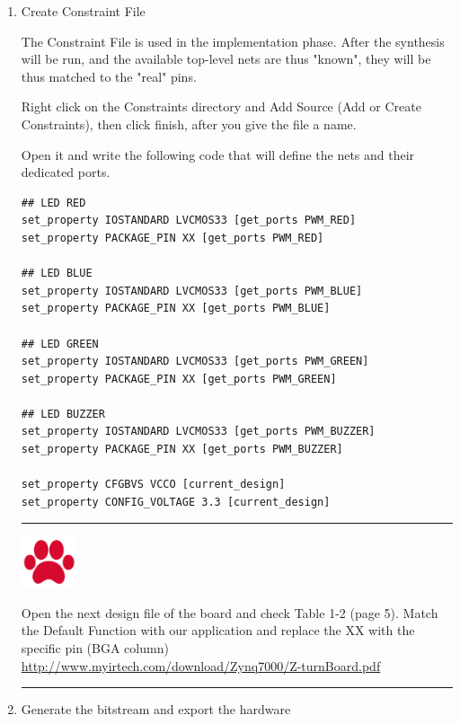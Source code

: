 \documentclass{article}
\begin{document}
\begin{enumerate}
 \item Create Constraint File
 
The Constraint File is used in the implementation phase. After the synthesis will be run, and the available top-level nets are thus "known", they will be thus matched to the "real" pins.
  
Right click on the Constraints directory and Add Source (Add or Create Constraints), then click finish, after you give the file a name.

Open it and write the following code that will define the nets and their dedicated ports.

\begin{verbatim}
## LED RED
set_property IOSTANDARD LVCMOS33 [get_ports PWM_RED]
set_property PACKAGE_PIN XX [get_ports PWM_RED]

## LED BLUE
set_property IOSTANDARD LVCMOS33 [get_ports PWM_BLUE]
set_property PACKAGE_PIN XX [get_ports PWM_BLUE]

## LED GREEN
set_property IOSTANDARD LVCMOS33 [get_ports PWM_GREEN]
set_property PACKAGE_PIN XX [get_ports PWM_GREEN]

## LED BUZZER
set_property IOSTANDARD LVCMOS33 [get_ports PWM_BUZZER]
set_property PACKAGE_PIN XX [get_ports PWM_BUZZER]

set_property CFGBVS VCCO [current_design]
set_property CONFIG_VOLTAGE 3.3 [current_design]

\end{verbatim}

\noindent\rule{16.5cm}{1pt}

\noindent\begin{minipage}{.1\textwidth}
  \centering
  \includegraphics[height=1.5cm]{img/icon.png}
\end{minipage}
\begin{minipage}{.8\textwidth}
Open the next design file of the board and check Table 1-2 (page 5). Match the Default Function with our application and replace the XX with the specific pin (BGA column)
\url{http://www.myirtech.com/download/Zynq7000/Z-turnBoard.pdf}
\end{minipage}%

\noindent\rule{16.5cm}{1pt}


\item Generate the bitstream and export the hardware



\end{enumerate}
\end{document}
